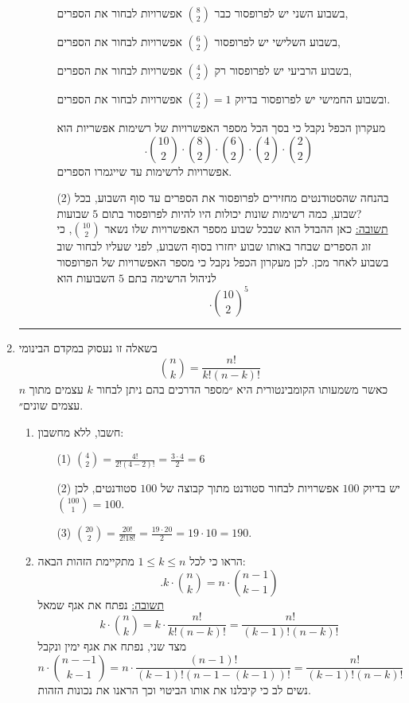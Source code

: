 \documentclass[12pt, a4paper]{article}
\begin{document}
\begin{enumerate}
\begin{enumerate}
\begin{enumerate}
בשבוע השני יש לפרופסור כבר
$\binom{8}{2}$
אפשרויות לבחור את הספרים,

בשבוע השלישי יש לפרופסור
$\binom{6}{2}$
אפשרויות לבחור את הספרים,

 בשבוע הרביעי יש לפרופסור רק
 $\binom{4}{2}$
 אפשרויות לבחור את הספרים,
 
 ובשבוע החמישי יש לפרופסור  בדיוק
 $\binom{2}{2}=1$
 אפשרויות לבחור את הספרים.
 
 מעקרון הכפל נקבל כי בסך הכל מספר האפשרויות של רשימות אפשריות הוא 
 $$.\boxed{\binom{10}{2}\cdot \binom{8}{2}\cdot 
 \binom{6}{2}\cdot
 \binom{4}{2}\cdot \binom{2}{2}}$$
 אפשרויות לרשימות עד שייגמרו הספרים.
 
\item[(2)]
בהנחה
שהסטודנטים מחזירים לפרופסור את הספרים עד סוף השבוע, בכל שבוע, כמה רשימות שונות יכולות היו להיות לפרופסור בתום
$5$
שבועות?
\\

\underline{תשובה:}
כאן ההבדל הוא שבכל שבוע מספר האפשרויות שלו נשאר
$\binom{10}{2}$,
כי זוג הספרים שבחר באותו שבוע יחזרו בסוף השבוע, לפני שעליו לבחור שוב בשבוע לאחר מכן.
לכן מעקרון הכפל נקבל כי מספר האפשרויות של הפרופסור לניהול הרשימה בתם
$5$
השבועות הוא
$$.\boxed{\binom{10}{2}^5}$$
\end{enumerate}
\end{enumerate}

\noindent\rule{17cm}{0.4pt}


\item
 בשאלה זו נעסוק במקדם הבינומי
 $$\binom{n}{k}=\frac{n!}{k!(n-k)!}$$
 כאשר משמעותו הקומבינטורית היא ״מספר הדרכים בהם ניתן לבחור
 $k$
 עצמים מתוך
 $n$
 עצמים שונים״.
\begin{enumerate}
\item
חשבו, ללא מחשבון:
\begin{enumerate}
\item[(1)]
$\boxed{\binom{4}{2}=\frac{4!}{2!(4-2)!}=\frac{3\cdot 4}{2}=6}$
\item[(2)]
יש בדיוק
$100$
אפשרויות לבחור
סטודנט  מתוך קבוצה של
$100$
סטודנטים,
לכן
$\boxed{\binom{100}{1}=100}$.
\item[(3)]
$\boxed{\binom{20}{2}=\frac{20!}{2!18!}=\frac{19\cdot 20}{2}=19\cdot 10=190}$.
\\
\end{enumerate}
\item
הראו כי
לכל
$1\le k\le n$
 מתקיימת הזהות הבאה:
$$.k\cdot \binom{n}{k}
=n\cdot \binom{n-1}{k-1}$$
\underline{תשובה:}
נפתח את אגף שמאל 
$$k\cdot \binom{n}{k}
=
k\cdot \frac{n!}{k!(n-k)!}
=\frac{n!}{(k-1)!(n-k)!}$$
מצד שני, נפתח את אגף ימין ונקבל
$$n\cdot\binom{n--1}{k-1}
=n\cdot
\frac{(n-1)!}{(k-1)!(n-1-(k-1))!}
=
\frac{n!}{(k-1)!(n-k)!}$$
נשים לב כי קיבלנו את אותו הביטוי וכך הראנו את נכונות הזהות.
\\


\end{enumerate}
\end{enumerate}
\end{document}
